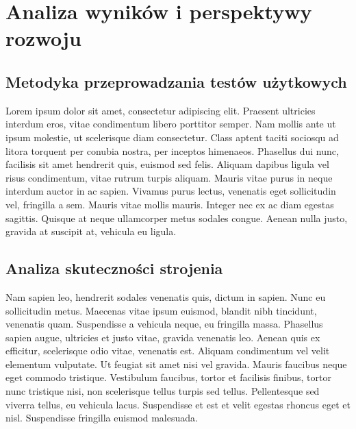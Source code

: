 
\setlength{\parindent}{1.25cm} %

\section{Analiza wyników i perspektywy rozwoju}

\subsection{Metodyka przeprowadzania testów użytkowych}
\begin{spacing}{1.5} %
    Lorem ipsum dolor sit amet, consectetur adipiscing elit. Praesent ultricies interdum eros, vitae condimentum libero porttitor semper. Nam mollis ante ut ipsum molestie, ut scelerisque diam consectetur. Class aptent taciti sociosqu ad litora torquent per conubia nostra, per inceptos himenaeos. Phasellus dui nunc, facilisis sit amet hendrerit quis, euismod sed felis. Aliquam dapibus ligula vel risus condimentum, vitae rutrum turpis aliquam. Mauris vitae purus in neque interdum auctor in ac sapien. Vivamus purus lectus, venenatis eget sollicitudin vel, fringilla a sem. Mauris vitae mollis mauris. Integer nec ex ac diam egestas sagittis. Quisque at neque ullamcorper metus sodales congue. Aenean nulla justo, gravida at suscipit at, vehicula eu ligula. 
\end{spacing} %

\subsection{Analiza skuteczności strojenia}
\begin{spacing}{1.5} %
    Nam sapien leo, hendrerit sodales venenatis quis, dictum in sapien. Nunc eu sollicitudin metus. Maecenas vitae ipsum euismod, blandit nibh tincidunt, venenatis quam. Suspendisse a vehicula neque, eu fringilla massa. Phasellus sapien augue, ultricies et justo vitae, gravida venenatis leo. Aenean quis ex efficitur, scelerisque odio vitae, venenatis est. Aliquam condimentum vel velit elementum vulputate. Ut feugiat sit amet nisi vel gravida. Mauris faucibus neque eget commodo tristique. Vestibulum faucibus, tortor et facilisis finibus, tortor nunc tristique nisi, non scelerisque tellus turpis sed tellus. Pellentesque sed viverra tellus, eu vehicula lacus. Suspendisse et est et velit egestas rhoncus eget et nisl. Suspendisse fringilla euismod malesuada. 
\end{spacing} %

